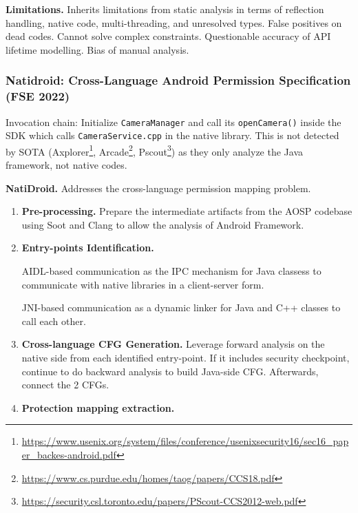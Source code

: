 \textbf{Limitations.} Inherits limitations from static analysis in terms of reflection handling, native code, multi-threading, and unresolved types. False positives on dead codes. Cannot solve complex constraints. Questionable accuracy of API lifetime modelling. Bias of manual analysis. 




\subsubsection{Natidroid: Cross-Language Android Permission Specification (FSE 2022)}

Invocation chain: Initialize \texttt{CameraManager} and call its \texttt{openCamera()} inside the SDK which calls \texttt{CameraService.cpp} in the native library. This is not detected by SOTA (Axplorer\footnote{\url{https://www.usenix.org/system/files/conference/usenixsecurity16/sec16_paper_backes-android.pdf}}, Arcade\footnote{\url{https://www.cs.purdue.edu/homes/taog/papers/CCS18.pdf}}, Pscout\footnote{\url{https://security.csl.toronto.edu/papers/PScout-CCS2012-web.pdf}}) as they only analyze the Java framework, not native codes.

\textbf{NatiDroid.} Addresses the cross-language permission mapping problem.

\begin{enumerate}
    \item \textbf{Pre-processing.} Prepare the intermediate artifacts from the AOSP codebase using Soot and Clang to allow the analysis of Android Framework.

    \item \textbf{Entry-points Identification.} 
    
    AIDL-based communication as the IPC mechanism for Java classess to communicate with native libraries in a client-server form. 

    JNI-based communication as a dynamic linker for Java and C++ classes to call each other.  

    \item \textbf{Cross-language CFG Generation.} Leverage forward analysis on the native side from each identified entry-point. If it includes security checkpoint, continue to do backward analysis to build Java-side CFG. Afterwards, connect the 2 CFGs.




    \item \textbf{Protection mapping extraction.} 

\end{enumerate}

